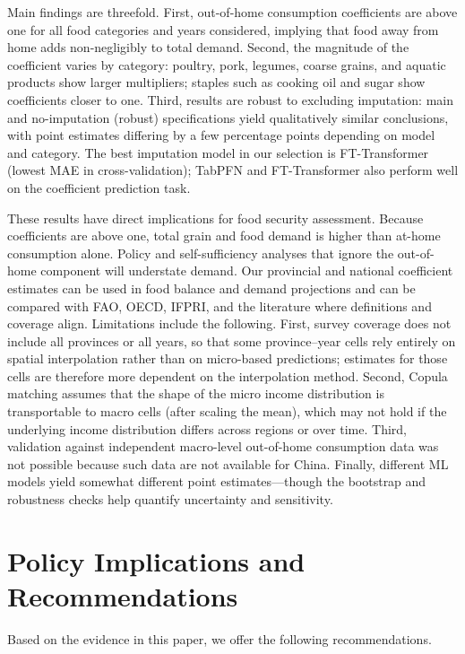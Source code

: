 \documentclass[12pt,a4paper]{article}
\begin{document}
Main findings are threefold. First, out-of-home consumption coefficients are above one for all food categories and years considered, implying that food away from home adds non-negligibly to total demand. Second, the magnitude of the coefficient varies by category: poultry, pork, legumes, coarse grains, and aquatic products show larger multipliers; staples such as cooking oil and sugar show coefficients closer to one. Third, results are robust to excluding imputation: main and no-imputation (robust) specifications yield qualitatively similar conclusions, with point estimates differing by a few percentage points depending on model and category. The best imputation model in our selection is FT-Transformer (lowest MAE in cross-validation); TabPFN and FT-Transformer also perform well on the coefficient prediction task.

These results have direct implications for food security assessment. Because coefficients are above one, total grain and food demand is higher than at-home consumption alone. Policy and self-sufficiency analyses that ignore the out-of-home component will understate demand. Our provincial and national coefficient estimates can be used in food balance and demand projections and can be compared with FAO, OECD, IFPRI, and the literature where definitions and coverage align. Limitations include the following. First, survey coverage does not include all provinces or all years, so that some province--year cells rely entirely on spatial interpolation rather than on micro-based predictions; estimates for those cells are therefore more dependent on the interpolation method. Second, Copula matching assumes that the shape of the micro income distribution is transportable to macro cells (after scaling the mean), which may not hold if the underlying income distribution differs across regions or over time. Third, validation against independent macro-level out-of-home consumption data was not possible because such data are not available for China. Finally, different ML models yield somewhat different point estimates—though the bootstrap and robustness checks help quantify uncertainty and sensitivity.

\section{Policy Implications and Recommendations}
\label{sec:policy}

Based on the evidence in this paper, we offer the following recommendations.
\end{document}
